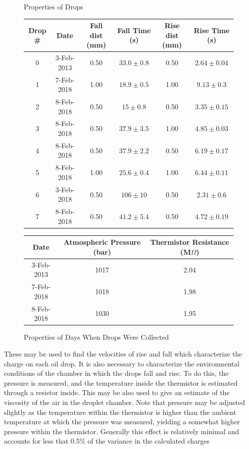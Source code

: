 \documentclass[]{article}
\begin{document}
\begin{figure}[h]
	\centering
	\caption{Properties of Drops}
\begin{tabular}{ | c | c | c | c | c | c |}
	\hline 
	Drop \# & Date & Fall dist (mm) & Fall Time (s) & Rise dist (mm) & Rise Time (s) \\ \hline
	0 & 3-Feb-2013 & 0.50 & \( 33.0 \pm  0.8 \)  & 0.50 & \( 2.64 \pm 0.04 \) \\
	1 & 7-Feb-2018 & 1.00 & \( 18.9 \pm  0.5 \)  & 1.00 & \( 9.13 \pm 0.3 \) \\
	2 & 8-Feb-2018 & 0.50 & \(15 \pm  0.8 \)  & 0.50 & \( 3.35 \pm 0.15 \) \\
	3 & 8-Feb-2018 & 0.50 & \( 37.9 \pm  3.5 \)  & 1.00 & \( 4.85 \pm 0.03 \) \\
	4 & 8-Feb-2018 & 0.50 & \( 37.9 \pm  2.2 \)  & 0.50 & \( 6.19 \pm 0.17 \) \\
	5 & 8-Feb-2018 & 1.00 & \( 25.6 \pm  0.4 \)  & 1.00 & \( 6.44 \pm 0.11 \) \\
	6 & 3-Feb-2018 & 0.50 & \( 106 \pm 10 \)  & 0.50 & \( 2.31 \pm 0.6 \) \\
	7 & 8-Feb-2018 & 0.50 & \( 41.2 \pm  5.4 \)  & 0.50 & \( 4.72 \pm 0.19 \) \\ \hline	       
\end{tabular}
\caption{Properties of Days When Drops Were Collected}
\begin{tabular}{ | c | c | c | }
	\hline
	Date & Atmospheric Pressure (bar) & Thermistor Resistance (M\( \Omega\))\\ \hline
	3-Feb-2013 & 1017 & 2.04 \\
	7-Feb-2018 & 1018 & 1.98 \\
	8-Feb-2018 & 1030 & 1.95 \\ \hline
\end{tabular}
\end{figure}

These may be used to find the velocities of rise and fall which characterize the charge on each oil drop. It is also necessary to characterize the environmental conditions of the chamber in which the drops fall and rise. To do this, the pressure is measured, and the temperature inside the thermistor is estimated through a resistor inside. This may be also used to give an estimate of the viscosity of the air in the droplet chamber. Note that pressure may be adjusted slightly as the temperature within the thermistor is higher than the ambient temperature at which the pressure was measured, yielding a somewhat higher pressure within the thermistor. Generally this effect is relatively minimal and accounts for less that 0.5\% of the variance in the calculated charges
\end{document}
